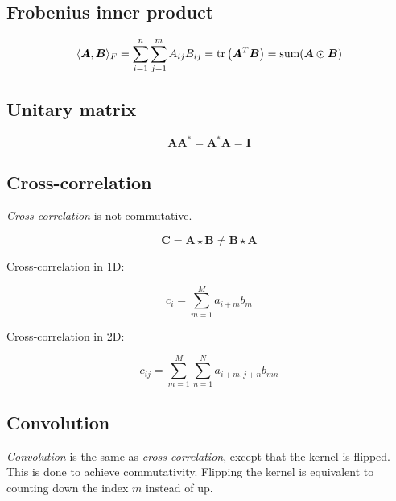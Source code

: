 \subsection{Frobenius inner product}\label{subsec:frobenius-inner-product}

\begin{equation}\label{eq:frobenius-inner-product}
    \langle \bm{A}, \bm{B} \rangle_F = \sum_{i=1}^{n} \sum_{j=1}^{m} A_{i j} B_{i j} =
    \text{tr} \left( \bm{A}^T \bm{B} \right) = \text{sum} (\bm{A} \varodot \bm{B})
\end{equation}


\subsection{Unitary matrix}\label{subsec:unitary-matrix}

\begin{equation}\label{eq:matrix-unitarity}
    \bm{A} \bm{A}^* = \bm{A}^* \bm{A} = \bm{I}
\end{equation}


\subsection{Cross-correlation}\label{subsec:cross-correlation}

\textit{Cross-correlation} is not commutative.

\begin{equation}\label{eq:cross-correlation}
    \bm{C} = \bm{A} \star \bm{B} \neq \bm{B} \star \bm{A}
\end{equation}

Cross-correlation in 1D:

\begin{equation}\label{eq:cross-correlation-elements-1d}
    c_i = \sum_{m=1}^{M} a_{i + m} b_m
\end{equation}

Cross-correlation in 2D:

\begin{equation}\label{eq:cross-correlation-elements-2d}
    c_{i j} = \sum_{m=1}^{M} \sum_{n=1}^{N} a_{i + m, j + n} b_{m n}
\end{equation}


\subsection{Convolution}\label{subsec:convolution}

\textit{Convolution} is the same as \textit{cross-correlation}, except that the kernel is flipped.
This is done to achieve commutativity. Flipping the kernel is equivalent to counting down the index $m$ instead of up.


